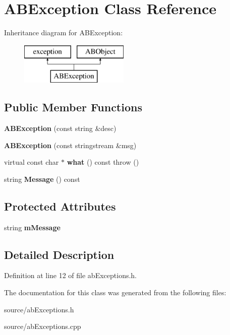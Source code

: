\hypertarget{class_a_b_exception}{}\section{A\+B\+Exception Class Reference}
\label{class_a_b_exception}
Inheritance diagram for A\+B\+Exception\+:\begin{figure}[H]
\begin{center}
\leavevmode
\includegraphics[height=2.000000cm]{class_a_b_exception}
\end{center}
\end{figure}
\subsection*{Public Member Functions}
\begin{DoxyCompactItemize}
\item 
{\bfseries A\+B\+Exception} (const string \&desc)\hypertarget{class_a_b_exception_afe0f40cac5db19bdb8d74da3e1a8433d}{}\label{class_a_b_exception_afe0f40cac5db19bdb8d74da3e1a8433d}

\item 
{\bfseries A\+B\+Exception} (const stringstream \&msg)\hypertarget{class_a_b_exception_a7f702901e7f92811e09583073ede5ba1}{}\label{class_a_b_exception_a7f702901e7f92811e09583073ede5ba1}

\item 
virtual const char $\ast$ {\bfseries what} () const   throw ()\hypertarget{class_a_b_exception_aabde441a97b16beca5b25e203a5f2d40}{}\label{class_a_b_exception_aabde441a97b16beca5b25e203a5f2d40}

\item 
string {\bfseries Message} () const \hypertarget{class_a_b_exception_aa41c1c2b8ba908e5db9c61b5bbc11926}{}\label{class_a_b_exception_aa41c1c2b8ba908e5db9c61b5bbc11926}

\end{DoxyCompactItemize}
\subsection*{Protected Attributes}
\begin{DoxyCompactItemize}
\item 
string {\bfseries m\+Message}\hypertarget{class_a_b_exception_a13d2233110b4ea23196c12c18d6ac593}{}\label{class_a_b_exception_a13d2233110b4ea23196c12c18d6ac593}

\end{DoxyCompactItemize}


\subsection{Detailed Description}


Definition at line 12 of file ab\+Exceptions.\+h.



The documentation for this class was generated from the following files\+:\begin{DoxyCompactItemize}
\item 
source/ab\+Exceptions.\+h\item 
source/ab\+Exceptions.\+cpp\end{DoxyCompactItemize}
